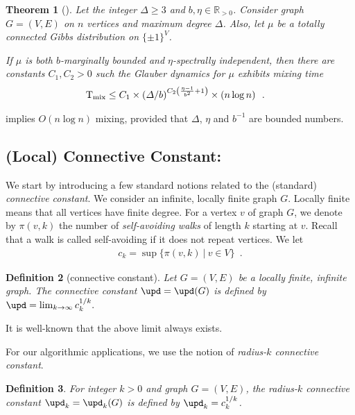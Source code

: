 \documentclass[11pt,reqno]{amsart}
\numberwithin{equation}{section}
\newtheorem{theorem}{Theorem}[section]
\newtheorem{definition}[theorem]{Definition}
\newcommand{\bluepigment}[1]{{\color{blue(pigment)}#1}}
\newcommand{\deeppink}[1]{{\color{deeppink}#1}}
\newcommand{\electricviolet}[1]{{\color{electricviolet}#1}}
\newcommand{\goldenbrown}[1]{{\color{goldenbrown}#1}}
\newcommand{\maxDeg}{{\Delta}}
\newcommand{\cconnective}{\goldenbrown{\upd}}
\renewcommand{\bluepigment}[1]{#1}
\renewcommand{\deeppink}[1]{#1}
\renewcommand{\electricviolet}[1]{#1}
\renewcommand{\goldenbrown}[1]{#1}
\newcommand{\kb}{\deeppink{b}}
\newcommand{\kk}{\bluepigment{k}}
\newcommand{\kv}{\electricviolet{v}}
\renewcommand{\kb}{b}
\renewcommand{\kk}{k}
\renewcommand{\kv}{v}
\begin{document}
\begin{theorem}[\cite{VigodaSpectralIndB}]\label{thrm:SPINLOGN} Let the integer $\maxDeg\geq 3$ and $b,\eta\in \mathbb{R}_{>0}$. 
Consider graph $G=(V,E)$ on $n$ vertices and maximum degree $\maxDeg$. Also, let $\mu$ be a totally connected Gibbs
distribution on $\{\pm 1\}^V$. 

If $\mu$ is both $b$-marginally bounded and $\eta$-spectrally independent, then there are constants $C_1, C_2>0$ such
the Glauber dynamics for $\mu$ exhibits mixing time
\begin{align}\nonumber 
{\rm T}_{\rm mix} &\leq C_1\times \left( {\maxDeg}/{b} \right)^{C_2\left ( \frac{\eta-1}{\kb^2}+1 \right)} \times \left( n \log n \right) \enspace.
\end{align} 
\end{theorem}
  implies  $O(n\log n)$  mixing, provided that $\maxDeg$, $\eta$ and $\kb^{-1}$ are bounded numbers.



\subsection{(Local) Connective Constant:}\label{sec:Intro2LCC}
We start by introducing a few standard notions related to the (standard) {\em connective constant}.
We consider an infinite, locally finite graph $G$. 
Locally finite means that all vertices have finite degree. For a vertex $\kv$ of graph $G$, we denote by $\pi(\kv,\kk)$ the 
number of {\em self-avoiding walks} of length $\kk$ starting at $\kv$. Recall that a walk is called self-avoiding if it does not repeat vertices. 
%
We let 
\begin{align}\nonumber
c_{\kk}=\sup\{ \pi(\kv,\kk)\ |\ \kv\in V\}\enspace. 
\end{align}


\begin{definition}[connective constant]\label{def:CCInfinite}
Let $G=(V,E)$ be a locally finite, infinite graph. The connective constant $\cconnective=\cconnective(G)$ is defined by
$\cconnective = \lim_{\kk \to \infty}c^{1/\kk}_{\kk} .$
\end{definition}
It is well-known that the above limit always exists. 

For our algorithmic applications, we use  the notion of {\em radius-$\kk$ connective constant}. 
\begin{definition}\label{def:LocalCC}
For integer $\kk>0$ and graph $G=(V,E)$, the radius-$\kk$ connective constant $\cconnective_{\kk}=\cconnective_{\kk}(G)$ is defined by
$\cconnective_{\kk}= c^{1/\kk}_{\kk}$.
\end{definition}
\end{document}
